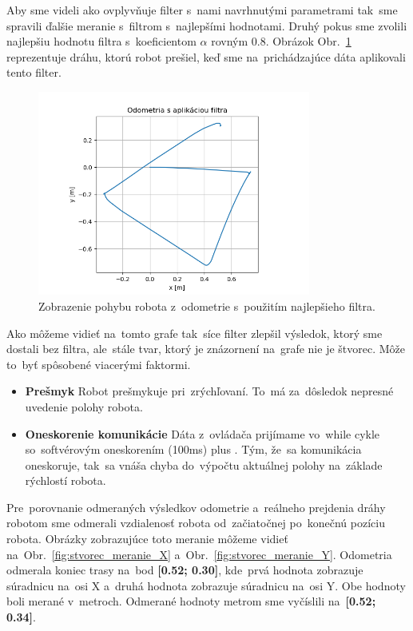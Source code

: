 Aby sme videli ako ovplyvňuje filter s~nami navrhnutými parametrami tak~sme spravili ďalšie meranie s~filtrom
s~najlepšími hodnotami. Druhý pokus sme zvolili najlepšiu hodnotu filtra s~koeficientom $\alpha$ rovným 0.8.
Obrázok Obr.~\ref{fig:stvorecSFiltrom} reprezentuje dráhu, ktorú robot prešiel, keď sme na~prichádzajúce dáta
aplikovali tento filter.

\begin{figure}[!htbp]
	\begin{center}
		\includegraphics[width=0.8\textwidth]{img/stvorec_s_filtrom_3.png}
	\end{center}
	\caption{Zobrazenie pohybu robota z~odometrie s~použitím najlepšieho filtra.}
	\label{fig:stvorecSFiltrom}
\end{figure}

Ako môžeme vidieť na~tomto grafe tak~síce filter zlepšil výsledok, ktorý sme dostali bez filtra, ale~stále tvar, ktorý
je znázornení na~grafe nie je štvorec. Môže to~byť spôsobené viacerými faktormi.

\begin{itemize}
	\item \textbf{Prešmyk} Robot prešmykuje pri~zrýchľovaní. To~má za~dôsledok nepresné uvedenie polohy robota.
	\item \textbf{Oneskorenie komunikácie} Dáta z~ovládača prijímame vo~while cykle so~softvérovým oneskorením (100ms)
		plus \cite{timovyProjekt}. Tým, že~sa komunikácia oneskoruje, tak~sa vnáša chyba do~výpočtu aktuálnej polohy
		na~základe rýchlostí robota.
\end{itemize}

Pre~porovnanie odmeraných výsledkov odometrie a~reálneho prejdenia dráhy robotom sme odmerali vzdialenosť robota
od~začiatočnej po~konečnú pozíciu robota. Obrázky zobrazujúce toto meranie môžeme vidieť
na~Obr.~\ref{fig:stvorec_meranie_X} a~Obr.~\ref{fig:stvorec_meranie_Y}.
Odometria odmerala koniec trasy na~bod \textbf{[0.52; 0.30]}, kde~prvá hodnota zobrazuje súradnicu na~osi X a~druhá hodnota
zobrazuje súradnicu na~osi Y. Obe hodnoty boli merané v~metroch. Odmerané hodnoty metrom sme vyčíslili na~\textbf{[0.52; 0.34]}.

